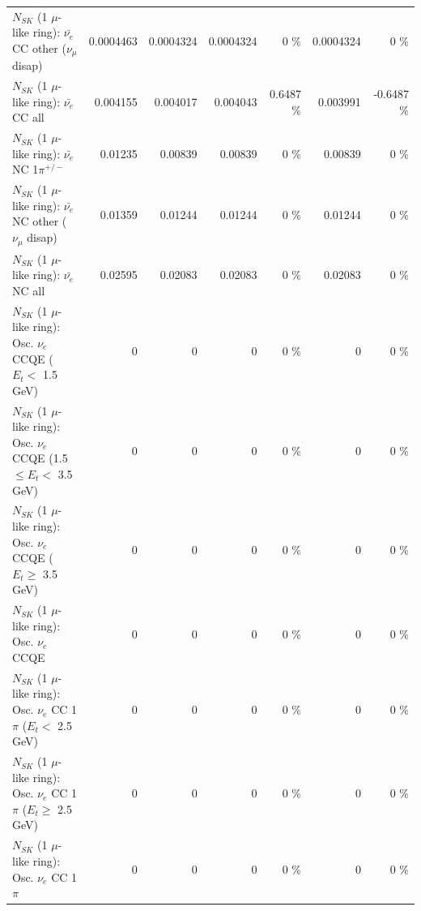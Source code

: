 \begin{table}
\begin{tabular}{| l | r | r | r  r | r  r |}
          $N_{SK}$ (1 $\mu$-like ring): $\bar{\nu_e}$ CC other ($\nu_\mu$ disap) &       0.0004463 &       0.0004324 &       0.0004324 &        0 \%  &       0.0004324 &        0 \%  \\ 
                            $N_{SK}$ (1 $\mu$-like ring): $\bar{\nu_{e}}$ CC all &        0.004155 &        0.004017 &        0.004043 &   0.6487 \%  &        0.003991 &  -0.6487 \%  \\ 
\hline
                     $N_{SK}$ (1 $\mu$-like ring): $\bar{\nu_e}$ NC 1$\pi^{+/-}$ &         0.01235 &         0.00839 &         0.00839 &        0 \%  &         0.00839 &        0 \%  \\ 
          $N_{SK}$ (1 $\mu$-like ring): $\bar{\nu_e}$ NC other ($\nu_\mu$ disap) &         0.01359 &         0.01244 &         0.01244 &        0 \%  &         0.01244 &        0 \%  \\ 
                            $N_{SK}$ (1 $\mu$-like ring): $\bar{\nu_{e}}$ NC all &         0.02595 &         0.02083 &         0.02083 &        0 \%  &         0.02083 &        0 \%  \\ 
\hline
\hline
\hline
             $N_{SK}$ (1 $\mu$-like ring): Osc. $\nu_e$ CCQE ($E_{t} <$ 1.5 GeV) &               0 &               0 &               0 &        0 \%  &               0 &        0 \%  \\ 
    $N_{SK}$ (1 $\mu$-like ring): Osc. $\nu_e$ CCQE (1.5 $\leq E_{t} <$ 3.5 GeV) &               0 &               0 &               0 &        0 \%  &               0 &        0 \%  \\ 
          $N_{SK}$ (1 $\mu$-like ring): Osc. $\nu_e$ CCQE ($E_{t} \geq$ 3.5 GeV) &               0 &               0 &               0 &        0 \%  &               0 &        0 \%  \\ 
\hline
                                 $N_{SK}$ (1 $\mu$-like ring): Osc. $\nu_e$ CCQE &               0 &               0 &               0 &        0 \%  &               0 &        0 \%  \\ 
\hline
        $N_{SK}$ (1 $\mu$-like ring): Osc. $\nu_e$ CC 1$\pi$ ($E_{t} <$ 2.5 GeV) &               0 &               0 &               0 &        0 \%  &               0 &        0 \%  \\ 
     $N_{SK}$ (1 $\mu$-like ring): Osc. $\nu_e$ CC 1$\pi$ ($E_{t} \geq$ 2.5 GeV) &               0 &               0 &               0 &        0 \%  &               0 &        0 \%  \\ 
\hline
                            $N_{SK}$ (1 $\mu$-like ring): Osc. $\nu_e$ CC 1$\pi$ &               0 &               0 &               0 &        0 \%  &               0 &        0 \%  \\ 

\end{tabular}
\end{table}
